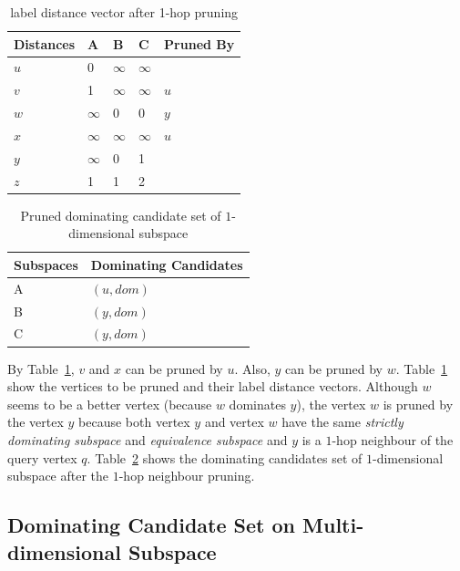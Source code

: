 \begin{table}[h]
    \centering
    \begin{tabular}{lllll}
    \hline
    Distances & A & B & C & Pruned By\\ \hline
    $u$       & 0 & $\infty$ & $\infty$ &\\ \hline
    $v$       & 1 & $\infty$ & $\infty$ & $u$\\ \hline
    $w$       & $\infty$ & 0 & 0 & $y$\\ \hline
    $x$       & $\infty$ & $\infty$ & $\infty$ & $u$\\ \hline
    $y$       & $\infty$ & 0 & 1 & \\ \hline
    $z$       & 1 & 1 & 2 &\\ \hline
    \end{tabular}
    \caption{\label{tab:lv_pruned} label distance vector after 1-hop pruning}
    
\end{table}

\begin{table}[h]
    \centering
    \begin{tabular}{|l|l|}
    \hline
    Subspaces & Dominating Candidates \\ \hline
    A         & $(u, dom)$            \\ \hline
    B         & $(y, dom)$            \\ \hline
    C         & $(y, dom)$            \\ \hline
    \end{tabular}
    \caption{\label{tab:dom_cand_pruned} Pruned dominating candidate set of $1$-dimensional subspace}
    
\end{table}

By Table~\ref{tab:lv_pruned}, $v$ and $x$ can be pruned by $u$. Also, $y$ can be pruned by $w$. Table~\ref{tab:lv_pruned} show the vertices to be pruned and their label distance vectors. Although $w$ seems to be a better vertex (because $w$ dominates $y$),  the vertex $w$ is pruned by the vertex $y$ because both vertex $y$ and vertex $w$ have the same \emph{strictly dominating subspace} and \emph{equivalence subspace} and $y$ is a $1$-hop neighbour of the query vertex $q$. Table~\ref{tab:dom_cand_pruned} shows the dominating candidates set of $1$-dimensional subspace after the $1$-hop neighbour pruning.

\subsection{Dominating Candidate Set on Multi-dimensional Subspace}

